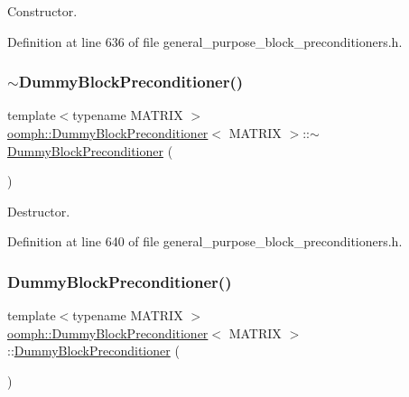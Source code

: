 Constructor. 



Definition at line 636 of file general\+\_\+purpose\+\_\+block\+\_\+preconditioners.\+h.

\mbox{\label{classoomph_1_1DummyBlockPreconditioner_ab979650b9f218ac3e896104d15efe3c1}} 
\subsubsection{\texorpdfstring{$\sim$\+Dummy\+Block\+Preconditioner()}{~DummyBlockPreconditioner()}}
{\footnotesize\ttfamily template$<$typename M\+A\+T\+R\+IX $>$ \\
\hyperlink{classoomph_1_1DummyBlockPreconditioner}{oomph\+::\+Dummy\+Block\+Preconditioner}$<$ M\+A\+T\+R\+IX $>$\+::$\sim$\hyperlink{classoomph_1_1DummyBlockPreconditioner}{Dummy\+Block\+Preconditioner} (\begin{DoxyParamCaption}{ }\end{DoxyParamCaption})\hspace{0.3cm}{\ttfamily [inline]}}



Destructor. 



Definition at line 640 of file general\+\_\+purpose\+\_\+block\+\_\+preconditioners.\+h.

\mbox{\label{classoomph_1_1DummyBlockPreconditioner_a7799bc2b9fa191d25902680b301d8de3}} 
\subsubsection{\texorpdfstring{Dummy\+Block\+Preconditioner()}{DummyBlockPreconditioner()}\hspace{0.1cm}{\footnotesize\ttfamily [2/2]}}
{\footnotesize\ttfamily template$<$typename M\+A\+T\+R\+IX $>$ \\
\hyperlink{classoomph_1_1DummyBlockPreconditioner}{oomph\+::\+Dummy\+Block\+Preconditioner}$<$ M\+A\+T\+R\+IX $>$\+::\hyperlink{classoomph_1_1DummyBlockPreconditioner}{Dummy\+Block\+Preconditioner} (\begin{DoxyParamCaption}\item[{const \hyperlink{classoomph_1_1DummyBlockPreconditioner}{Dummy\+Block\+Preconditioner}$<$ M\+A\+T\+R\+IX $>$ \&}]{ }\end{DoxyParamCaption})\hspace{0.3cm}{\ttfamily [inline]}}



